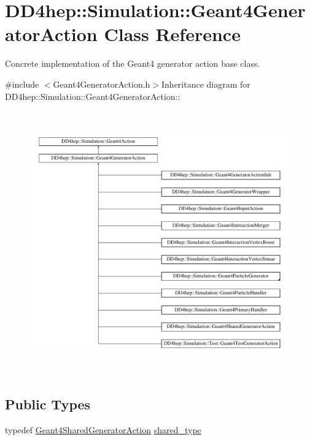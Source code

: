 \hypertarget{class_d_d4hep_1_1_simulation_1_1_geant4_generator_action}{
\section{DD4hep::Simulation::Geant4GeneratorAction Class Reference}
\label{class_d_d4hep_1_1_simulation_1_1_geant4_generator_action}
}


Concrete implementation of the Geant4 generator action base class.  


{\ttfamily \#include $<$Geant4GeneratorAction.h$>$}Inheritance diagram for DD4hep::Simulation::Geant4GeneratorAction::\begin{figure}[H]
\begin{center}
\leavevmode
\includegraphics[height=11.375cm]{class_d_d4hep_1_1_simulation_1_1_geant4_generator_action}
\end{center}
\end{figure}
\subsection*{Public Types}
\begin{DoxyCompactItemize}
\item 
typedef \hyperlink{class_d_d4hep_1_1_simulation_1_1_geant4_shared_generator_action}{Geant4SharedGeneratorAction} \hyperlink{class_d_d4hep_1_1_simulation_1_1_geant4_generator_action_a21b579b261763b82cb86a001c8502c65}{shared\_\-type}
\end{DoxyCompactItemize}
